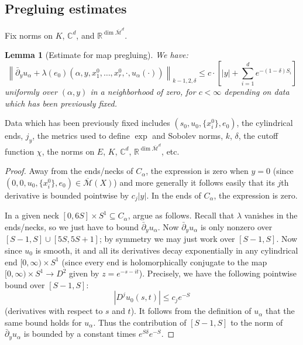 \documentclass[12pt]{article}
\newtheorem{lemma}[theorem]{Lemma}
\theoremstyle{definition}
\theoremstyle{remark}
\numberwithin{equation}{subsection}
\newcommand{\CC}{\mathbb C}
\newcommand{\RR}{\mathbb R}
\newcommand{\Mbar}{\overline{\mathcal M}}
\newcommand{\delbar}{\bar\partial}
\begin{document}
\subsection{Pregluing estimates}

Fix norms on $K$, $\CC^d$, and $\RR^{\dim\Mbar^d}$.

\begin{lemma}[Estimate for map pregluing]\label{mappregluingissmall}
We have:
\begin{equation}
\left\|\delbar_yu_\alpha+\lambda(e_0)(\alpha,y,x_1^0,\ldots,x_r^0,\cdot,u_\alpha(\cdot))\right\|_{k-1,2,\delta}\leq c\cdot\left[\left|y\right|+\sum_{i=1}^de^{-(1-\delta)S_i}\right]
\end{equation}
uniformly over $(\alpha,y)$ in a neighborhood of zero, for $c<\infty$ depending on data which has been previously fixed.
\end{lemma}

Data which has been previously fixed includes $(s_0,u_0,\{x_i^0\},e_0)$, the cylindrical ends, $j_y$, the metrics used to define $\exp$ and Sobolev norms, $k$, $\delta$, the cutoff function $\chi$, the norms on $E$, $K$, $\CC^d$, $\RR^{\dim\Mbar^d}$, etc.

\begin{proof}
Away from the ends/necks of $C_\alpha$, the expression is zero when $y=0$ (since $(0,0,u_0,\{x_i^0\},e_0)\in\Mbar(X)$) and more generally it follows easily that its $j$th derivative is bounded pointwise by $c_j\left|y\right|$.  In the ends of $C_\alpha$, the expression is zero.

In a given neck $[0,6S]\times S^1\subseteq C_\alpha$, argue as follows.  Recall that $\lambda$ vanishes in the ends/necks, so we just have to bound $\delbar_yu_\alpha$.  Now $\delbar_yu_\alpha$ is only nonzero over $[S-1,S]\cup[5S,5S+1]$; by symmetry we may just work over $[S-1,S]$.  Now since $u_0$ is smooth, it and all its derivatives decay exponentially in any cylindrical end $[0,\infty)\times S^1$ (since every end is holomorphically conjugate to the map $[0,\infty)\times S^1\to D^2$ given by $z=e^{-s-it}$).  Precisely, we have the following pointwise bound over $[S-1,S]$:
\begin{equation}\label{uzeroexponentialdecay}
\left|D^ju_0(s,t)\right|\leq c_je^{-S}
\end{equation}
(derivatives with respect to $s$ and $t$).  It follows from the definition of $u_\alpha$ that the same bound holds for $u_\alpha$.  Thus the contribution of $[S-1,S]$ to the norm of $\delbar_yu_\alpha$ is bounded by a constant times $e^{S\delta}e^{-S}$.
\end{proof}
\end{document}

